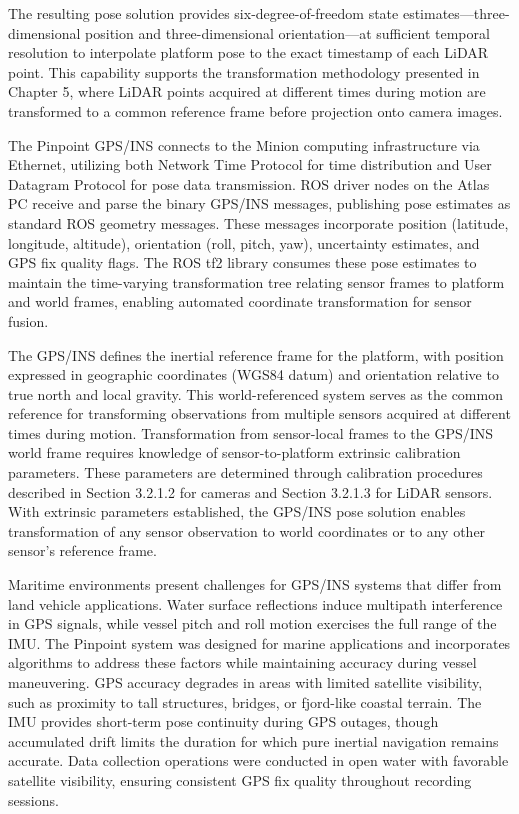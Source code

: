 \documentclass{erauthesis}
\begin{document}
The resulting pose solution provides six-degree-of-freedom state estimates—three-dimensional position and three-dimensional orientation—at sufficient temporal resolution to interpolate platform pose to the exact timestamp of each \ac{LiDAR} point.
This capability supports the transformation methodology presented in Chapter 5, where \ac{LiDAR} points acquired at different times during motion are transformed to a common reference frame before projection onto camera images.

The Pinpoint \ac{GPS}/\ac{INS} connects to the Minion computing infrastructure via Ethernet, utilizing both Network Time Protocol for time distribution and User Datagram Protocol for pose data transmission.
\ac{ROS} driver nodes on the Atlas PC receive and parse the binary \ac{GPS}/\ac{INS} messages, publishing pose estimates as standard \ac{ROS} geometry messages.
These messages incorporate position (latitude, longitude, altitude), orientation (roll, pitch, yaw), uncertainty estimates, and \ac{GPS} fix quality flags.
The \ac{ROS} tf2 library consumes these pose estimates to maintain the time-varying transformation tree relating sensor frames to platform and world frames, enabling automated coordinate transformation for sensor fusion.

The \ac{GPS}/\ac{INS} defines the inertial reference frame for the platform, with position expressed in geographic coordinates (WGS84 datum) and orientation relative to true north and local gravity.
This world-referenced system serves as the common reference for transforming observations from multiple sensors acquired at different times during motion.
Transformation from sensor-local frames to the \ac{GPS}/\ac{INS} world frame requires knowledge of sensor-to-platform extrinsic calibration parameters.
These parameters are determined through calibration procedures described in Section 3.2.1.2 for cameras and Section 3.2.1.3 for \ac{LiDAR} sensors.
With extrinsic parameters established, the \ac{GPS}/\ac{INS} pose solution enables transformation of any sensor observation to world coordinates or to any other sensor's reference frame.

Maritime environments present challenges for \ac{GPS}/\ac{INS} systems that differ from land vehicle applications.
Water surface reflections induce multipath interference in \ac{GPS} signals, while vessel pitch and roll motion exercises the full range of the \ac{IMU}.
The Pinpoint system was designed for marine applications and incorporates algorithms to address these factors while maintaining accuracy during vessel maneuvering.
\ac{GPS} accuracy degrades in areas with limited satellite visibility, such as proximity to tall structures, bridges, or fjord-like coastal terrain.
The \ac{IMU} provides short-term pose continuity during \ac{GPS} outages, though accumulated drift limits the duration for which pure inertial navigation remains accurate.
Data collection operations were conducted in open water with favorable satellite visibility, ensuring consistent \ac{GPS} fix quality throughout recording sessions.
\end{document}
